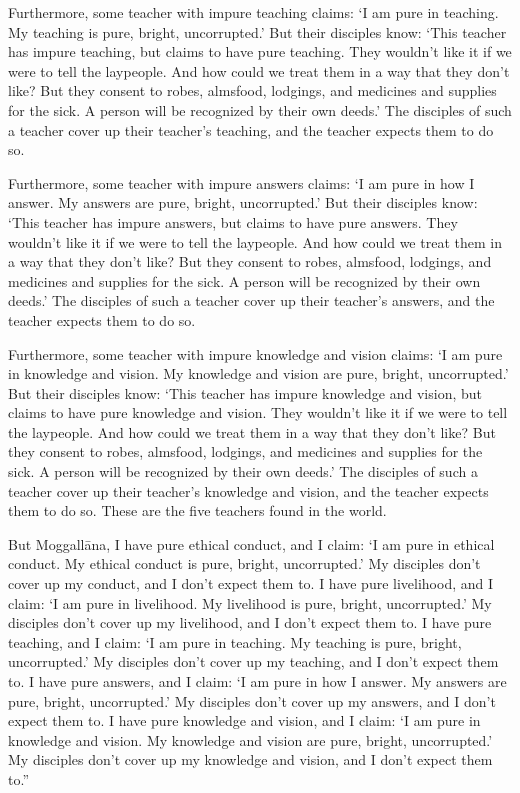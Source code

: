 \documentclass[12pt,openany]{book}%
\begin{document}
Furthermore, some teacher with impure teaching claims: ‘I am pure in teaching. My teaching is pure, bright, uncorrupted.’ But their disciples know: ‘This teacher has impure teaching, but claims to have pure teaching. They wouldn’t like it if we were to tell the laypeople. And how could we treat them in a way that they don’t like? But they consent to robes, almsfood, lodgings, and medicines and supplies for the sick. A person will be recognized by their own deeds.’ The disciples of such a teacher cover up their teacher’s teaching, and the teacher expects them to do so. 

Furthermore, some teacher with impure answers claims: ‘I am pure in how I answer. My answers are pure, bright, uncorrupted.’ But their disciples know: ‘This teacher has impure answers, but claims to have pure answers. They wouldn’t like it if we were to tell the laypeople. And how could we treat them in a way that they don’t like? But they consent to robes, almsfood, lodgings, and medicines and supplies for the sick. A person will be recognized by their own deeds.’ The disciples of such a teacher cover up their teacher’s answers, and the teacher expects them to do so. 

Furthermore, some teacher with impure knowledge and vision claims: ‘I am pure in knowledge and vision. My knowledge and vision are pure, bright, uncorrupted.’ But their disciples know: ‘This teacher has impure knowledge and vision, but claims to have pure knowledge and vision. They wouldn’t like it if we were to tell the laypeople. And how could we treat them in a way that they don’t like? But they consent to robes, almsfood, lodgings, and medicines and supplies for the sick. A person will be recognized by their own deeds.’ The disciples of such a teacher cover up their teacher’s knowledge and vision, and the teacher expects them to do so. These are the five teachers found in the world. 

But \textsanskrit{Moggallāna}, I have pure ethical conduct, and I claim: ‘I am pure in ethical conduct. My ethical conduct is pure, bright, uncorrupted.’ My disciples don’t cover up my conduct, and I don’t expect them to. I have pure livelihood, and I claim: ‘I am pure in livelihood. My livelihood is pure, bright, uncorrupted.’ My disciples don’t cover up my livelihood, and I don’t expect them to. I have pure teaching, and I claim: ‘I am pure in teaching. My teaching is pure, bright, uncorrupted.’ My disciples don’t cover up my teaching, and I don’t expect them to. I have pure answers, and I claim: ‘I am pure in how I answer. My answers are pure, bright, uncorrupted.’ My disciples don’t cover up my answers, and I don’t expect them to. I have pure knowledge and vision, and I claim: ‘I am pure in knowledge and vision. My knowledge and vision are pure, bright, uncorrupted.’ My disciples don’t cover up my knowledge and vision, and I don’t expect them to.” 
\end{document}
